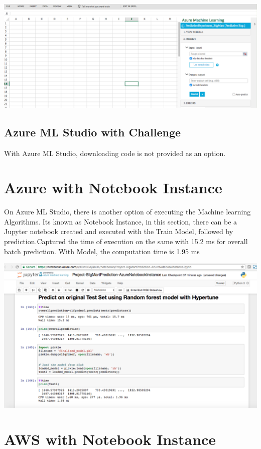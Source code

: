 \includegraphics[width=\columnwidth]{Images/mlstudio/csvscreenshot.png}


\subsection{Azure ML Studio with Challenge}
With Azure ML Studio, downloading code is not provided as an option.

\section{Azure with Notebook Instance}

On Azure ML Studio, there is another option of executing the Machine 
learning Algorithms. Its known as Notebook Instance, in this section, 
there can be a Jupyter notebook created and executed with the Train Model, 
followed by prediction.Captured the time of execution on the same with 15.2 ms 
for overall batch prediction. With Model, the computation time is 1.95 ms


\includegraphics[width=\columnwidth]{Images/Azurenotebookscreenshot.png}


\section{AWS with Notebook Instance}

